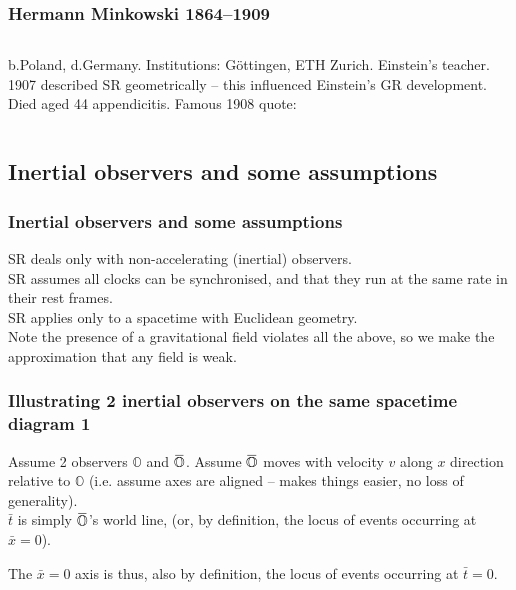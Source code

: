 \documentclass[xcolor=x11names,compress]{beamer}
\renewcommand{\(}{\begin{columns}}
\renewcommand{\)}{\end{columns}}
\newcommand{\<}[1]{\begin{column}{#1}}
\renewcommand{\>}{\end{column}}
\newcommand{\overbar}[1]{\mkern 1.5mu\overline{\mkern-1.5mu#1\mkern-1.5mu}\mkern 1.5mu}
\newcommand{\oframe}{\mathbb{O}}
\newcommand{\obarframe}{\overbar{\mathbb{O}}}
\begin{document}
\begin{frame}
\frametitle{Hermann Minkowski 1864--1909}
\begin{columns}[c] 
\column{3.0in}
b.Poland, d.Germany. Institutions: G\"ottingen, ETH Zurich. Einstein's
teacher.  1907 described SR geometrically -- this influenced Einstein's GR
development.  Died aged 44 appendicitis.  Famous 1908 quote:
\vspace{0.2in}\newline
{}
\column{1.5in} 
\end{columns}
\end{frame}

\subsection{Inertial observers and some assumptions}
\begin{frame}
\frametitle{Inertial observers and some assumptions}
SR deals only with non-accelerating (inertial) observers.\\
\bigskip
SR assumes all clocks can be synchronised, and that they
run at the same rate in their rest frames.\\
\bigskip
SR applies only to a spacetime with Euclidean geometry.\\
\bigskip
Note the presence of a gravitational field violates all the above,
so we make the approximation that any field is weak. 
\end{frame}

\begin{frame}
\frametitle{Illustrating 2 inertial observers on the same spacetime diagram 1}
Assume 2 observers $\oframe$ and $\obarframe$.  Assume $\obarframe$ moves with
velocity $v$ along $x$ direction relative to $\oframe$ (i.e. assume axes
are aligned -- makes things easier, no loss of generality).\\
$\bar{t}$ is simply  $\obarframe$'s world line, (or, by definition,
the locus of events occurring at $\bar{x}=0$).
\begin{center}
\end{center}
The $\bar{x}=0$ axis is thus, also by definition, the locus of events
occurring at $\bar{t}=0.$
\end{frame}
\end{document}
